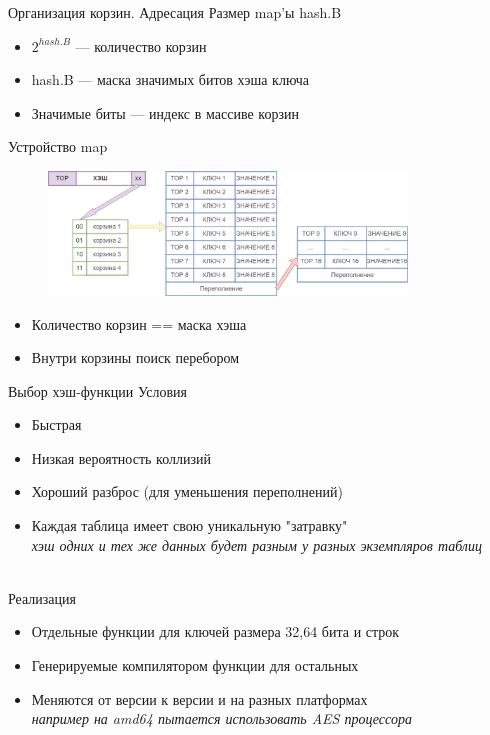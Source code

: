 \documentclass[aspectratio=169]{beamer}
\begin{document}
\begin{frame}{Организация корзин. Адресация}
        Размер map'ы hash.B
        \begin{itemize}
                \item $2^{hash.B}$ --- количество корзин
                \item hash.B --- маска значимых битов хэша ключа \\
                \item Значимые биты --- индекс в массиве корзин
        \end{itemize}
\end{frame}

\begin{frame}[label=buckets]{Устройство map}
        \begin{figure}
                \includegraphics[width=0.85\textwidth]{img/buckets.png} \\
        \end{figure}
        \begin{itemize}
                \item Количество корзин == маска хэша
                \item Внутри корзины поиск перебором
        \end{itemize}
\end{frame}

\begin{frame}{Выбор хэш-функции}
        Условия
        \begin{itemize}
               \item Быстрая
               \item Низкая вероятность коллизий
               \item Хороший разброс (для уменьшения переполнений)
               \item Каждая таблица имеет свою уникальную "затравку" \\
               \textit{\small хэш одних и тех же данных будет разным у разных экземпляров таблиц}
        \end{itemize}
        ~\\
        Реализация
        \begin{itemize}
                \item Отдельные функции для ключей размера 32,64 бита и строк
                \item Генерируемые компилятором функции для остальных
                \item Меняются от версии к версии и на разных платформах\\
                \textit{\small например на amd64 пытается использовать AES процессора}
        \end{itemize}
\end{frame}
\end{document}
